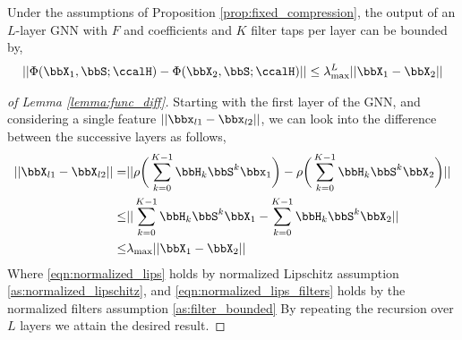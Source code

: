 \begin{lemma}\label{lemma:func_diff}
	Under the assumptions of Proposition \ref{prop:fixed_compression}, the output of an $L$-layer GNN with $F$ and coefficients and $K$ filter taps per layer can be bounded by,
	\begin{align}
		||\Phi(\bbX_1,\bbS;\ccalH) - \Phi(\bbX_2,\bbS;\ccalH)  ||\leq \lambda_{\max}^L ||\bbX_1-\bbX_2||
	\end{align}
\end{lemma}
\begin{proof}[of Lemma \ref{lemma:func_diff}]
	Starting with the first layer of the GNN, and considering a single feature $||\bbx_{l1}-\bbx_{l2}||$, we can look into the difference between the successive layers as follows, 
	\begin{align}
		||\bbX_{l1}-\bbX_{l2}|| =& ||\non\bigg(\sum_{k=0}^{K-1}\bbH_k \bbS^k\bbx_{1}\bigg)-\non\bigg(\sum_{k=0}^{K-1}\bbH_k \bbS^k\bbX_{2}\bigg)||\\
		\leq& ||\sum_{k=0}^{K-1}\bbH_k \bbS^k\bbX_{1}-\sum_{k=0}^{K-1}\bbH_k \bbS^k\bbX_{2}||\label{eqn:normalized_lips}\\
		\leq& \lambda_{\max}||\bbX_{1}-\bbX_{2}|| \label{eqn:normalized_lips_filters}%
	\end{align}
 Where \eqref{eqn:normalized_lips} holds by normalized Lipschitz assumption \ref{as:normalized_lipschitz}, and \eqref{eqn:normalized_lips_filters} holds by the normalized filters assumption \ref{as:filter_bounded}
	By repeating the recursion over $L$ layers we attain the desired result.
\end{proof}

